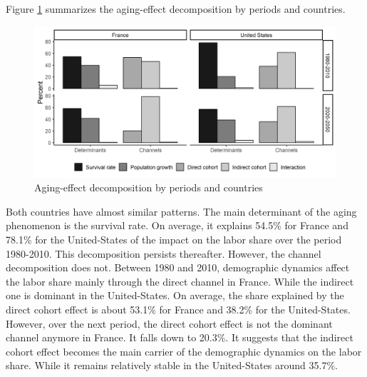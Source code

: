 Figure \ref{fig:decomp_1970} summarizes the aging-effect decomposition by periods and countries.
\begin{figure}[tb]
	\centering
	\includegraphics[width=1\linewidth]{../result/decomposition/decomp_country_period.png}
	\caption{Aging-effect decomposition by periods and countries}
	\label{fig:decomp_1970}
\end{figure}
Both countries have almost similar patterns. The main determinant of the aging phenomenon is the survival rate. On average, it explains 54.5\% for France and 78.1\% for the United-States of the impact on the labor share over the period 1980-2010. This decomposition persists thereafter. However, the channel decomposition does not. Between 1980 and 2010, demographic dynamics affect the labor share mainly through the direct channel in France. While the indirect one is dominant in the United-States. On average, the share explained by the direct cohort effect is about 53.1\% for France and 38.2\% for the United-States. However, over the next period, the direct cohort effect is not the dominant channel anymore in France. It falls down to 20.3\%. It suggests that the indirect cohort effect becomes the main carrier of the demographic dynamics on the labor share. While it remains relatively stable in the United-States around 35.7\%.



